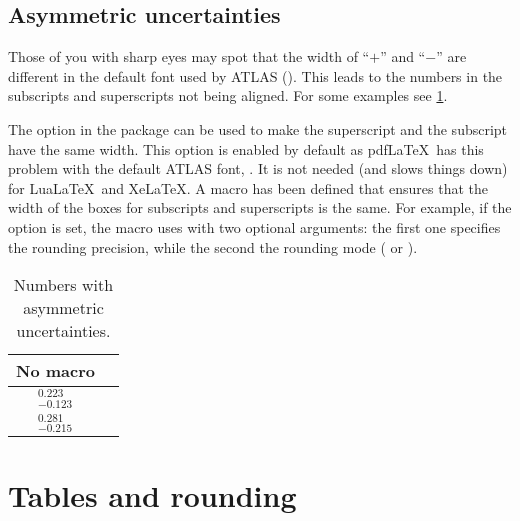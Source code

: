 \documentclass[REPORT=false, UKenglish]{atlasdoc}
\begin{document}
\subsection{Asymmetric uncertainties}

Those of you with sharp eyes may spot that the width of \enquote{\(+\)} and \enquote{\(-\)}
are different in the default font used by ATLAS ().
This leads to the numbers in the subscripts and superscripts not being aligned.
For some examples see \cref{tab:asym}.

The option  in the  package
can be used to make the superscript and the subscript
have the same width.
This option is enabled by default as pdf\LaTeX\ has this problem
with the default ATLAS font, .
It is not needed (and slows things down) for Lua\LaTeX\ and Xe\LaTeX.
A macro  has been defined that ensures that the width
of the boxes for subscripts and superscripts is the same.
For example, if the  option is set,
the macro  uses  with two optional arguments:
the first one specifies the rounding precision, while the second the rounding mode
( or ).

\begin{table}[htbp]
\begin{tcblisting}{}
  \caption{Numbers with asymmetric uncertainties.}%
  \label{tab:asym}
  \centering
  \renewcommand{\arraystretch}{1.4}
  \begin{tabular}{cc}
    \toprule
    No macro & \Macro{numpmerr} \\
    \midrule
    \(^{\num{+0.223}}_{\num{-0.123}}\) & \numpmerr{+0.223}{-0.123} \\
    \(^{\num{+0.281}}_{\num{-0.215}}\) & \numpmerrx[round-precision=2]{+0.281}{-0.215}
  \end{tabular}
\end{tcblisting}
\end{table}

\section{Tables and rounding}
\end{document}
